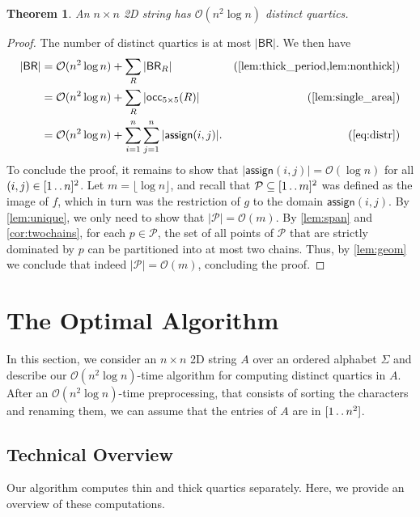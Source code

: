 \documentclass[11pt,letterpaper]{article}
\newcommand{\cO}{\mathcal{O}}
\newcommand{\BR}{\textsf{BR}}
\def\dd{\mathinner{.\,.}}
\newcommand{\OCR}{\textsf{occ}_{5\times 5}}
\newcommand{\assign}{\textsf{assign}}
\renewcommand{\P}{\mathcal{P}}
\newtheorem{theorem}{Theorem}[section]
\begin{document}
\begin{theorem}\label{thm:main}
An $n \times n$ 2D string has $\cO(n^2 \log n)$ distinct quartics.
\end{theorem}
\begin{proof}
The number of distinct quartics is at most $|\BR|$.
We then have
\begin{align*}
|\BR| & =\cO(n^2 \log n) + \sum_R |\BR_R| & \text{(\cref{lem:thick_period,lem:nonthick})} \\
    & = \cO(n^2 \log n) + \sum_R |\OCR(R)| & \text{(\cref{lem:single_area})} \\
    & = \cO(n^2 \log n) + \sum_{i=1}^{n}\sum_{j=1}^{n}|\assign(i,j)|. & \text{(\ref{eq:distr})}
\end{align*}
To conclude the proof, it remains to show that $|\assign(i,j)|=\cO(\log n)$ for all $(i,j)\in [1\dd n]^2$.
Let $m=\lfloor\log n\rfloor$, and
recall that $\P \subseteq [1 \dd m]^2$ was defined as the image of $f$, which in turn was the restriction of $g$ to
the domain $\assign(i,j)$.
By \cref{lem:unique}, we only need to show that $|\P|=\cO(m)$.
By \cref{lem:span} and \cref{cor:twochains}, for each $p\in \P$, the set of all points of $\P$
that are strictly dominated by $p$ can be partitioned into at most two chains.
Thus, by \cref{lem:geom} we conclude that indeed $|\P|=\cO(m)$, concluding the proof.
\end{proof}


\section{The Optimal Algorithm}
\label{sec:algo}

In this section, we consider an $n\times n$ 2D string $A$ over an ordered alphabet $\Sigma$ and describe our $\cO(n^2 \log n)$-time algorithm for computing distinct quartics in $A$.
After an $\cO(n^2 \log n)$-time preprocessing, that consists of sorting the characters and renaming them, we can assume that the entries of $A$ are in $[1 \dd n^{2}]$.

\subsection{Technical Overview}
\label{sec:over}
Our algorithm computes thin and thick quartics separately.
Here, we provide an overview of these computations.
\end{document}
